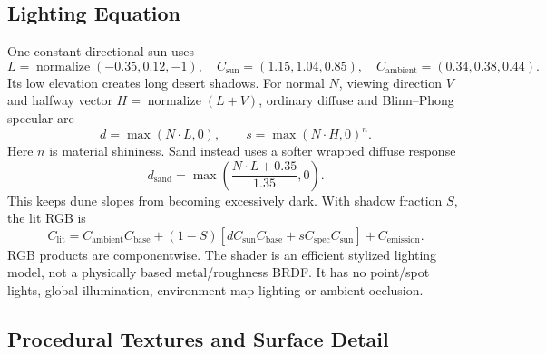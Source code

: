 \subsection{Lighting Equation}
One constant directional sun uses
\begin{equation}
L=\operatorname{normalize}(-0.35,0.12,-1),\quad
C_{\mathrm{sun}}=(1.15,1.04,0.85),\quad C_{\mathrm{ambient}}=(0.34,0.38,0.44).
\end{equation}
Its low elevation creates long desert shadows. For normal $N$, viewing direction $V$ and halfway vector $H=\operatorname{normalize}(L+V)$, ordinary diffuse and Blinn--Phong specular are
\begin{equation}
d=\max(N\cdot L,0),\qquad s=\max(N\cdot H,0)^n.
\end{equation}
Here $n$ is material shininess. Sand instead uses a softer wrapped diffuse response
\begin{equation}
d_{\mathrm{sand}}=\max\left(\frac{N\cdot L+0.35}{1.35},0\right).
\end{equation}
This keeps dune slopes from becoming excessively dark. With shadow fraction $S$, the lit RGB is
\begin{equation}
C_{\mathrm{lit}}=C_{\mathrm{ambient}}C_{\mathrm{base}}
+(1-S)[dC_{\mathrm{sun}}C_{\mathrm{base}}+sC_{\mathrm{spec}}C_{\mathrm{sun}}]
+C_{\mathrm{emission}}.
\end{equation}
RGB products are componentwise. The shader is an efficient stylized lighting model, not a physically based metal/roughness BRDF. It has no point/spot lights, global illumination, environment-map lighting or ambient occlusion.

\subsection{Procedural Textures and Surface Detail}
